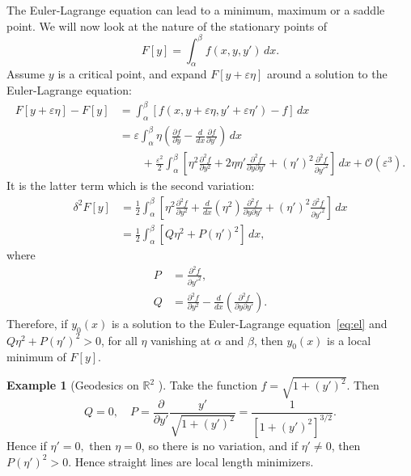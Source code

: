 \documentclass[12pt]{article}
\theoremstyle{definition}
\newtheorem{example}{Example}[section]
\theoremstyle{remark}
\begin{document}
The Euler-Lagrange equation can lead to a minimum, maximum or a saddle point. We will now look at the nature of the stationary points of
\[
	F[y] = \int_{\alpha}^{\beta} f(x, y, y')\, dx
.\]
Assume $y$ is a critical point, and expand $F[y + \varepsilon \eta]$ around a solution to the Euler-Lagrange equation:
\begin{align*}
	F[y + \varepsilon \eta] - F[y] &= \int_{\alpha}^{\beta} [f(x, y + \varepsilon \eta, y' + \varepsilon \eta') - f]\, dx \\
				       &= \varepsilon \int_{\alpha}^{\beta} \eta \left(\frac{\partial f}{\partial y} - \frac{d}{dx} \frac{\partial f}{\partial y'} \right) \, dx \\
				       &\qquad + \frac{\varepsilon^2}{2} \int_{\alpha}^{\beta} \left[ \eta^2 \frac{\partial^2 f}{\partial y^2} + 2 \eta \eta' \frac{\partial^2 f}{\partial y \partial y'} + (\eta')^2 \frac{\partial^2 f}{\partial y'^2} \right] \, dx + \mathcal{O}(\varepsilon^3).
\end{align*}
It is the latter term which is the second variation:
\begin{align*}
	\delta^2F[y] &= \frac{1}{2} \int_{\alpha}^{\beta} \left[ \eta^2 \frac{\partial^2 f}{\partial y^2} + \frac{d}{dx} (\eta^2) \frac{\partial^2 f}{\partial y \partial y'} + (\eta')^2 \frac{\partial^2 f}{\partial y'^2}\right]\, dx \\
		     &= \frac{1}{2} \int_{\alpha}^{\beta} \left[Q \eta^2 + P(\eta')^2 \right] \, dx, \tag{8.1}\label{eq:sv}
\end{align*}
where
\begin{align*}
	P &= \frac{\partial^2 f}{\partial y'^2}, \\
	Q &= \frac{\partial^2 f}{\partial y^2} - \frac{d}{dx} \left( \frac{\partial^2 f}{\partial y \partial y'} \right).
\end{align*}
Therefore, if $y_0(x)$ is a solution to the Euler-Lagrange equation~\eqref{eq:el} and $Q\eta^2 + P(\eta')^2 > 0$, for all $\eta$ vanishing at $\alpha$ and $\beta$, then $y_0(x)$ is a local minimum of $F[y]$.

\begin{adjustbox}{minipage = \columnwidth - 25.5pt, margin=1em, frame=1pt, margin=0em}
	\begin{example}[Geodesics on $\mathbb{R}^2$ ]
		Take the function $f = \sqrt{1 + (y')^2}$. Then
		\[
			Q = 0, \quad P = \frac{\partial}{\partial y'} \frac{y'}{\sqrt{1 + (y')^2}} = \frac{1}{[1 + (y')^2]^{3/2}}
		.\]
		Hence if $\eta' = 0,$ then $\eta = 0$, so there is no variation, and if $\eta' \neq 0$, then $P(\eta')^2 > 0$. Hence straight lines are local length minimizers.
\end{example}

\end{adjustbox}
\end{document}
